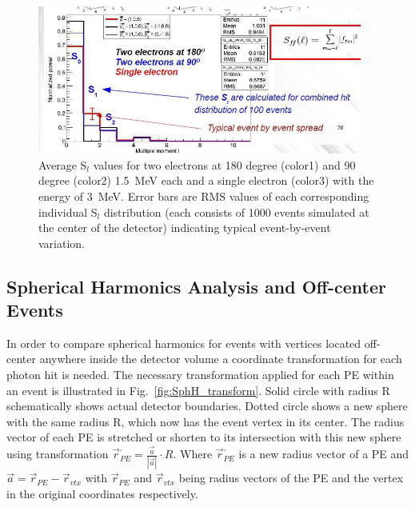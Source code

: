 \documentclass[12pt,twoside,letterpaper]{article}
\begin{document}
\begin{figure}[htb]
\centering
\includegraphics[angle=0,width=0.95\textwidth]{plots/Multiple_moment.JPG}
\caption{Average S$_l$ values for two electrons at 180 degree (color1) and 90 degree (color2) 1.5~MeV each and a single electron (color3) with the energy of 3~MeV. Error bars are RMS values of each corresponding individual S$_l$ distribution (each consists of 1000 events simulated at the center of the detector) indicating typical event-by-event variation.}
\label{fig:Moments}
\end{figure}




\subsection{Spherical Harmonics Analysis and Off-center Events}

In order to compare spherical harmonics for events with vertices located off-center anywhere inside the detector volume a coordinate transformation for each photon hit is needed. The necessary transformation applied for each PE within an event is illustrated in Fig.~\ref{fig:SphH_transform}. Solid circle with radius R schematically shows actual detector boundaries. Dotted circle shows a new sphere with the same radius R, which now has the event vertex in its center. The radius vector of each PE is stretched or shorten to its intersection with this new sphere using transformation $\vec{r}^{,}_{PE} = \frac{\vec{a}}{|\vec{a}|} \cdot R$. Where $\vec{r}^{,}_{PE}$ is a new radius vector of a PE and $\vec{a}=\vec{r}_{PE} - \vec{r}_{vtx}$ with $\vec{r}_{PE}$ and $\vec{r}_{vtx}$ being radius vectors of the PE and the vertex in the original coordinates respectively.
\end{document}
